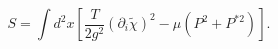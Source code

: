 \begin{equation} S=  \int d^2x\left[\frac{T}{2g^2}(\partial_i\tilde\chi)^2
- \mu\left(P^2+P^{*2}\right) \right].\label{hight}\end{equation}

